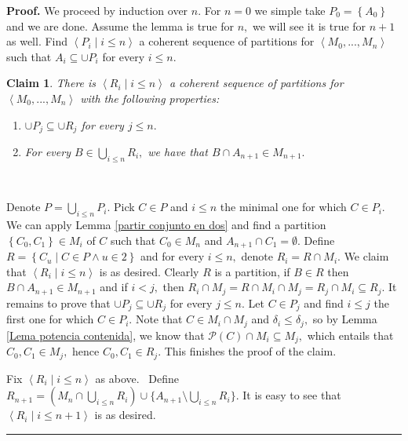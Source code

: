 \documentclass{article}%
\newtheorem{claim}[theorem]{Claim}
\newenvironment{proof}[1][Proof]{\noindent\textbf{#1.} }{\ \rule{0.5em}{0.5em}}
\begin{document}
\begin{proof}
We proceed by induction over $n.$ For $n=0$ we simple take $P_{0}=\left\{
A_{0}\right\}  $ and we are done. Assume the lemma is true for $n,$ we will
see it is true for $n+1$ as well. Find $\left\langle P_{i}\mid i\leq
n\right\rangle $ a coherent sequence of partitions for $\left\langle
M_{0},...,M_{n}\right\rangle $ such that $A_{i}\subseteq\cup P_{i}$ for every
$i\leq n.$

\begin{claim}
There is $\left\langle R_{i}\mid i\leq n\right\rangle $ a coherent sequence of
partitions for $\left\langle M_{0},...,M_{n}\right\rangle $ with the following properties:

\begin{enumerate}
\item $\cup P_{j}\subseteq\cup R_{j}$ for every $j\leq n.$

\item For every $B\in%
{\textstyle\bigcup\limits_{i\leq n}}
R_{i},$ we have that $B\cap A_{n+1}\in M_{n+1}.$
\end{enumerate}
\end{claim}

\qquad\ \ 

Denote $P=%
{\textstyle\bigcup\limits_{i\leq n}}
P_{i}.$ Pick $C\in P$ and $i\leq n$ the minimal one for which $C\in P_{i}.$ We
can apply Lemma \ref{partir conjunto en dos} and find a partition $\left\{
C_{0},C_{1}\right\}  \in M_{i}$ of $C$ such that $C_{0}\in M_{n}$ and
$A_{n+1}\cap C_{1}=\emptyset.$ Define $R=\left\{  C_{u}\mid C\in P\wedge
u\in2\right\}  $ and for every $i\leq n,$ denote $R_{i}=R\cap M_{i}.$ We claim
that $\left\langle R_{i}\mid i\leq n\right\rangle $ is as desired. Clearly $R$
is a partition, if $B\in R$ then $B\cap A_{n+1}\in M_{n+1}$ and if $i<j,$ then
$R_{i}\cap M_{j}=R\cap M_{i}\cap M_{j}=R_{j}\cap M_{i}\subseteq R_{j}.$ It
remains to prove that $\cup P_{j}\subseteq\cup R_{j}$ for every $j\leq n.$ Let
$C\in P_{j}$ and find $i\leq j$ the first one for which $C\in P_{i}.$ Note
that $C\in M_{i}\cap M_{j}$ and $\delta_{i}\leq\delta_{j},$ so by Lemma
\ref{Lema potencia contenida}, we know that $\mathcal{P}\left(  C\right)  \cap
M_{i}\subseteq M_{j},$ which entails that $C_{0},C_{1}\in M_{j},$ hence
$C_{0},C_{1}\in R_{j}.$ This finishes the proof of the claim.

\qquad\qquad\qquad

Fix $\left\langle R_{i}\mid i\leq n\right\rangle $ as above. \ Define
$R_{n+1}=(M_{n}\cap%
{\textstyle\bigcup\limits_{i\leq n}}
R_{i})\cup\{A_{n+1}\setminus%
{\textstyle\bigcup\limits_{i\leq n}}
R_{i}\}.$ It is easy to see that $\left\langle R_{i}\mid i\leq
n+1\right\rangle $ is as desired.
\end{proof}
\end{document}
